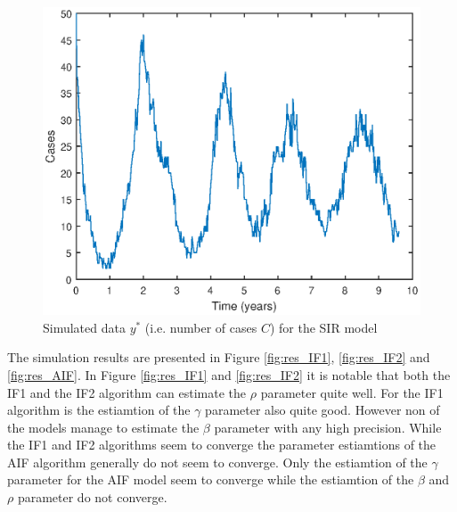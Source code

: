 \documentclass[twoside,openright]{report}
\begin{document}
\begin{figure}[ht]
  \centering
    \includegraphics[width=1\textwidth]{./fig_sir/Y_sim}
  \caption{Simulated data $y^{*}$ (i.e. number of cases $C$) for the SIR model}
  \label{fig:sim_Y_sir}
\end{figure} 

The simulation results are presented in Figure \ref{fig:res_IF1}, \ref{fig:res_IF2} and \ref{fig:res_AIF}. In Figure \ref{fig:res_IF1} and \ref{fig:res_IF2} it is notable that both the IF1 and the IF2 algorithm can estimate the $\rho$ parameter quite well. For the IF1 algorithm is the estiamtion of the $\gamma$ parameter also quite good. However non of the models manage to estimate the $\beta$ parameter with any high precision. While the IF1 and IF2 algorithms seem to converge the parameter estiamtions of the AIF algorithm generally do not seem to converge. Only the estiamtion of the $\gamma$ parameter for the AIF model seem to converge while the estiamtion of the $\beta$ and $\rho$ parameter do not converge.  
\end{document}
